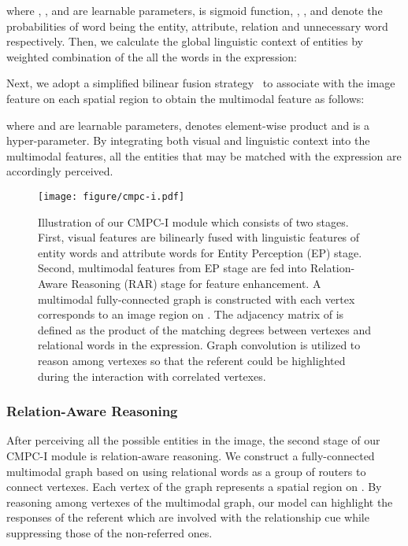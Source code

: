 \documentclass[10pt,journal,cspaper,compsoc]{IEEEtran}
\begin{document}
where , ,  and  are learnable parameters,  is sigmoid function, 
, ,  and  denote the probabilities of word  being the entity, attribute, relation and unnecessary word respectively. 
Then, we calculate the global linguistic context of entities  by weighted combination of the all the words in the expression: 


Next, we adopt a simplified bilinear fusion strategy~\cite{BenMUTAN} to associate  with the image feature  on each spatial region to obtain the multimodal feature  as follows:


where  and  are learnable parameters,  denotes element-wise product and  is a hyper-parameter.
By integrating both visual and linguistic context into the multimodal features, all the entities that may be matched with the expression are accordingly perceived.

\begin{figure*}[t]
   \begin{center}
      \texttt{[image: figure/cmpc-i.pdf]}
   \end{center}
      \caption{Illustration of our CMPC-I module which consists of two stages. 
      First, visual features  are bilinearly fused with linguistic features  of entity words and attribute words for Entity Perception (EP) stage. 
      Second, multimodal features  from EP stage are fed into Relation-Aware Reasoning (RAR) stage for feature enhancement. 
      A multimodal fully-connected graph  is constructed with each vertex corresponds to an image region on . 
      The adjacency matrix of  is defined as the product of the matching degrees between vertexes and relational words in the expression. 
      Graph convolution is utilized to reason among vertexes so that the referent could be 
      highlighted during the interaction with correlated vertexes.}
   \label{fig:reason}
\end{figure*}

\subsubsection{Relation-Aware Reasoning}
\label{sec:rar}
After perceiving all the possible entities in the image, the second stage of our CMPC-I module is relation-aware reasoning. 
We construct a fully-connected multimodal graph based on  using relational words as a group of routers to connect vertexes. 
Each vertex of the graph represents a spatial region on . 
By reasoning among vertexes of the multimodal graph, our model can highlight the responses of the referent which are involved with the relationship cue while suppressing those of the non-referred ones. 
\end{document}
